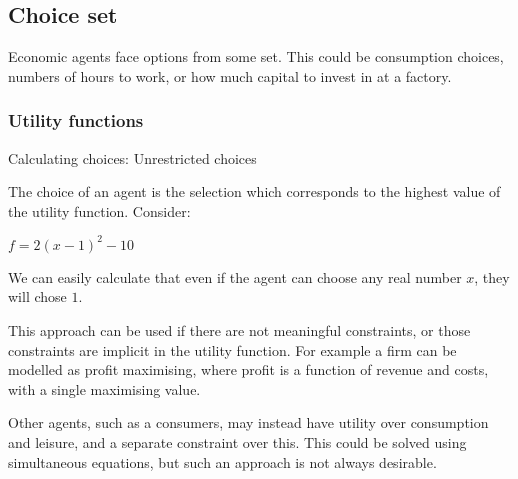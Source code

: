 
\subsection{Choice set}

Economic agents face options from some set. This could be consumption choices, numbers of hours to work, or how much capital to invest in at a factory.

\subsubsection{Utility functions}

Calculating choices: Unrestricted choices

The choice of an agent is the selection which corresponds to the highest value of the utility function. Consider:

\(f=2(x-1)^2-10\)

We can easily calculate that even if the agent can choose any real number \(x\), they will chose \(1\).

This approach can be used if there are not meaningful constraints, or those constraints are implicit in the utility function. For example a firm can be modelled as profit maximising, where profit is a function of revenue and costs, with a single maximising value.

Other agents, such as a consumers, may instead have utility over consumption and leisure, and a separate constraint over this. This could be solved using simultaneous equations, but such an approach is not always desirable.

